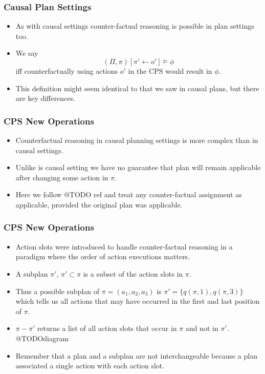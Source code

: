\documentclass{beamer}
\theoremstyle{plain}
\theoremstyle{definition}
\begin{document}
\begin{frame}
\frametitle{Causal Plan Settings}
\begin{itemize}
\item As with causal settings counter-factual reasoning is possible in plan settings too.
\item We say
\[
(\Pi, \pi)[\pi'\leftarrow o'] \models \phi
\]
iff counterfactually using actions $o'$ in the CPS would result in $\phi$.

\item This definition might seem identical to that we saw in causal plans, but there are key differences.
\end{itemize}

\end{frame}



\begin{frame}
\frametitle{CPS New Operations}

\begin{itemize}

\item Counterfactual reasoning in causal planning settings is more complex than in causal settings.
\item Unlike is causal setting we have no guarantee that plan will remain applicable after changing some action in $\pi$.
\item Here we follow @TODO ref and treat any counter-factual assignment as applicable, provided the original plan was applicable.

\end{itemize}

\end{frame}

\begin{frame}
\frametitle{CPS New Operations}
\begin{itemize}
\item  Action slots were introduced to handle counter-factual reasoning in a paradigm where the order of action executions matters.
\item A subplan $\pi'$, $\pi'\subset \pi$ is a subset of the action slots in $\pi$.
\item Thus a possible subplan of $\pi=(a_1,a_2,a_3)$ is $\pi'=\{q(\pi,1), q(\pi,3)\}$ which tells us all actions that may have occurred in the first and last position of $\pi$.
\item $\pi-\pi'$ returns a list of all action slots that occur in $\pi$ and not in $\pi'$. @TODOdiagram
\item Remember that a plan and a subplan are not interchangeable because a plan associated a single action with each action slot.
\end{itemize}

\end{frame}
\end{document}
